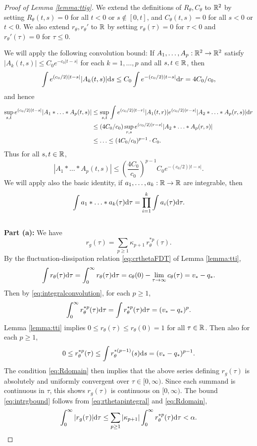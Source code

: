 \begin{proof}[Proof of Lemma \ref{lemma:ttig}]
We extend the definitions of $R_\theta,C_\theta$ to $\mathbb{R}^2$ by setting
$R_\theta(t,s)=0$ for all $t<0$ or $s \notin [0,t]$, and
$C_\theta(t,s)=0$ for all $s<0$ or $t<0$. We also extend $r_\theta,r_\theta'$ to
$\mathbb{R}$ by setting $r_\theta(\tau)=0$ for $\tau<0$
and $r_\theta'(\tau)=0$ for $\tau \leq 0$.

We will apply the following convolution bound: If
$A_1,\ldots,A_p:\mathbb{R}^2 \to \mathbb{R}^2$ satisfy
$|A_k(t,s)| \leq C_0e^{-c_0|t-s|}$ for each $k=1,\ldots,p$ and all $s,t \in \mathbb{R}$,
then
\[\int e^{(c_0/2)|t-s|}|A_k(t,s)| \mathrm{d} s \leq C_0\int e^{-(c_0/2)|t-s|}
\mathrm{d} r=4C_0/c_0,\]
and hence
\begin{align*}
\sup_{s,t}e^{(c_0/2)|t-s|} |A_1*\ldots*A_p(t,s)| 
&\leq \sup_{s,t}\int e^{(c_0/2)|t-r|}|A_1(t,r)|e^{(c_0/2)|r-s|} |A_2*\ldots*A_p(r,s)| \mathrm{d} r\\
&\leq (4C_0/c_0)\sup_{r,s} e^{(c_0/2)|r-s|}|A_2*\ldots*A_p(r,s)|\\
&\leq \ldots \leq (4C_0/c_0)^{p-1} \cdot C_0.
\end{align*}
Thus for all $s,t \in \mathbb{R}$,
\begin{equation}\label{eq:convolutionbound}
|A_1*\ldots*A_p(t,s)| \leq
\left(\frac{4C_0}{c_0}\right)^{p-1}C_0e^{-(c_0/2)|t-s|}.
\end{equation}
We will apply also the basic identity, if $a_1,\ldots,a_k:\mathbb{R} \to \mathbb{R}$ are
integrable, then
\begin{equation}\label{eq:integralconvolution}
\int a_1*\ldots*a_k(\tau)\mathrm{d} \tau
=\prod_{i=1}^k \int a_i(\tau)\mathrm{d} \tau.
\end{equation}\\

{\bf Part (a):} We have
\[r_g(\tau)=\sum_{p \geq 1} \kappa_{p+1}\,r_\theta^{*p}(\tau).\]
By the fluctuation-dissipation relation \eqref{eq:crthetaFDT} of
Lemma \ref{lemma:tti},
\[\int r_\theta(\tau)\mathrm{d} \tau
=\int_0^\infty r_\theta(\tau)\mathrm{d} \tau=c_\theta(0)
-\lim_{\tau \to \infty} c_\theta(\tau)=v_*-q_*.\]
Then by \eqref{eq:integralconvolution}, for each $p \geq 1$,
\begin{equation}\label{eq:rthetapintegral}
\int_0^\infty r_\theta^{*p}(\tau)\mathrm{d} \tau
=\int r_\theta^{*p}(\tau)\mathrm{d} \tau=(v_*-q_*)^p.
\end{equation}
Lemma \ref{lemma:tti} implies $0 \leq r_\theta(\tau) \leq
r_\theta(0)=1$ for all $\tau \in \mathbb{R}$. Then also for each $p \geq 1$,
\begin{equation}
0 \leq r_\theta^{*p}(\tau)
\leq \int r_\theta^{*(p-1)}(s) \mathrm{d} s
=(v_*-q_*)^{p-1}.\label{eq:rthetapbound1}
\end{equation}
The condition \eqref{eq:Rdomain} then implies that the above series defining
$r_g(\tau)$ is absolutely and uniformly convergent over $\tau \in [0,\infty)$.
Since each summand is continuous in $\tau$, this shows $r_g(\tau)$ is continuous
on $[0,\infty)$. The bound \eqref{eq:intrgbound} follows from
\eqref{eq:rthetapintegral} and \eqref{eq:Rdomain},
\[\int_0^\infty |r_g(\tau)| \mathrm{d} \tau
\leq \sum_{p \geq 1} |\kappa_{p+1}| \int_0^\infty r_\theta^{*p}(\tau) \mathrm{d} \tau
<\alpha.\]


\end{proof}
